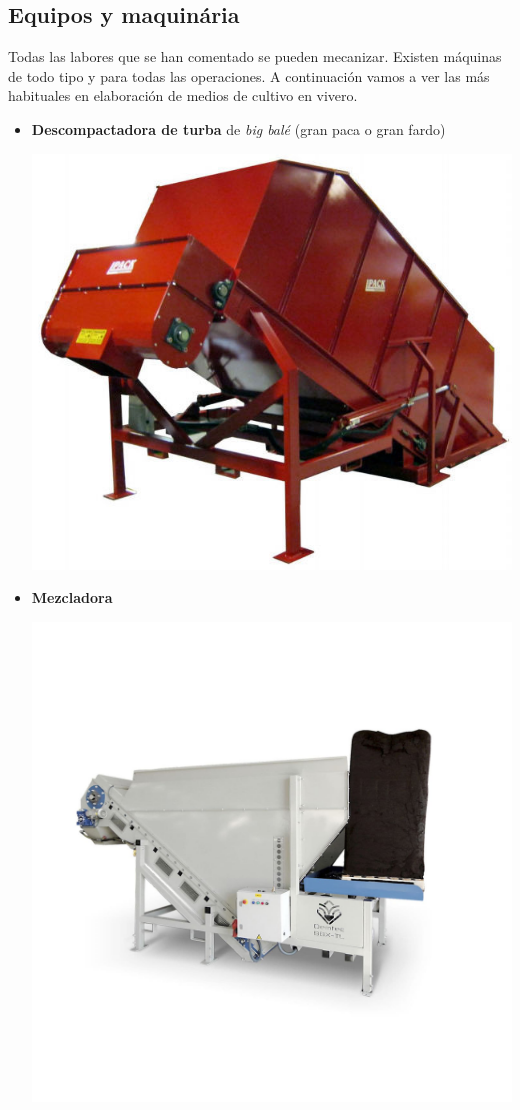 \documentclass[a4paper,12pt,oneside]{article}
\begin{document}
\subsection{Equipos y maquinária}
\label{sec:org5f49972}
Todas las labores que se han comentado se pueden mecanizar. Existen máquinas de
todo tipo y para todas las operaciones. A continuación vamos a ver las más
habituales en elaboración de medios de cultivo en vivero.
\begin{itemize}
\item \textbf{Descompactadora de turba} de \emph{big balé} (gran paca o gran fardo)
\begin{center}
\includegraphics[width=.9\linewidth]{./img_uf1596/big_bale.jpg}
\end{center}
\item \textbf{Mezcladora}
\begin{center}
\includegraphics[width=.9\linewidth]{./img_uf1596/mezcladora.jpg}

\end{center}
\end{itemize}
\end{document}
